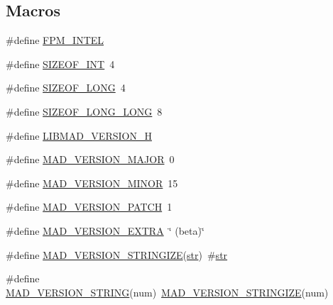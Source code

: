 \subsection*{Macros}
\begin{DoxyCompactItemize}
\item 
\#define \hyperlink{lib-src_2libmad_2msvc_09_09_2mad_8h_ac451994561cb3d439255059cff259057}{F\+P\+M\+\_\+\+I\+N\+T\+EL}
\item 
\#define \hyperlink{lib-src_2libmad_2msvc_09_09_2mad_8h_a44184cf844a916eee78598ab35fc966b}{S\+I\+Z\+E\+O\+F\+\_\+\+I\+NT}~4
\item 
\#define \hyperlink{lib-src_2libmad_2msvc_09_09_2mad_8h_a22aece5d034fd9040a3d01c3797fdfe7}{S\+I\+Z\+E\+O\+F\+\_\+\+L\+O\+NG}~4
\item 
\#define \hyperlink{lib-src_2libmad_2msvc_09_09_2mad_8h_acd1ddb89a6f7f17d1c152499173c3eef}{S\+I\+Z\+E\+O\+F\+\_\+\+L\+O\+N\+G\+\_\+\+L\+O\+NG}~8
\item 
\#define \hyperlink{lib-src_2libmad_2msvc_09_09_2mad_8h_ac7a67538f7cde81264037f2df80bf5ef}{L\+I\+B\+M\+A\+D\+\_\+\+V\+E\+R\+S\+I\+O\+N\+\_\+H}
\item 
\#define \hyperlink{lib-src_2libmad_2msvc_09_09_2mad_8h_a046f223d5458612e4227d402021ada6a}{M\+A\+D\+\_\+\+V\+E\+R\+S\+I\+O\+N\+\_\+\+M\+A\+J\+OR}~0
\item 
\#define \hyperlink{lib-src_2libmad_2msvc_09_09_2mad_8h_a6ce409f82a14d731eec40d2ee92a3b15}{M\+A\+D\+\_\+\+V\+E\+R\+S\+I\+O\+N\+\_\+\+M\+I\+N\+OR}~15
\item 
\#define \hyperlink{lib-src_2libmad_2msvc_09_09_2mad_8h_a41cada8d90ad1ca4f2ffd7d32d41b955}{M\+A\+D\+\_\+\+V\+E\+R\+S\+I\+O\+N\+\_\+\+P\+A\+T\+CH}~1
\item 
\#define \hyperlink{lib-src_2libmad_2msvc_09_09_2mad_8h_a4c77fa2bdf2db7ef43ae26203d8e01c7}{M\+A\+D\+\_\+\+V\+E\+R\+S\+I\+O\+N\+\_\+\+E\+X\+T\+RA}~\char`\"{} (beta)\char`\"{}
\item 
\#define \hyperlink{lib-src_2libmad_2msvc_09_09_2mad_8h_ac04935c11ed1c4151154bdbcb5a24065}{M\+A\+D\+\_\+\+V\+E\+R\+S\+I\+O\+N\+\_\+\+S\+T\+R\+I\+N\+G\+I\+ZE}(\hyperlink{sndfile__save_8m_a4b99ff73a8a869319570237b5c57ab03}{str})~\#\hyperlink{sndfile__save_8m_a4b99ff73a8a869319570237b5c57ab03}{str}
\item 
\#define \hyperlink{lib-src_2libmad_2msvc_09_09_2mad_8h_a6f4807e25002fd13a45907150769ded9}{M\+A\+D\+\_\+\+V\+E\+R\+S\+I\+O\+N\+\_\+\+S\+T\+R\+I\+NG}(num)~\hyperlink{mac_2config_2i386_2lib-src_2libmad_2mad_8h_ac04935c11ed1c4151154bdbcb5a24065}{M\+A\+D\+\_\+\+V\+E\+R\+S\+I\+O\+N\+\_\+\+S\+T\+R\+I\+N\+G\+I\+ZE}(num)

\end{DoxyCompactItemize}
